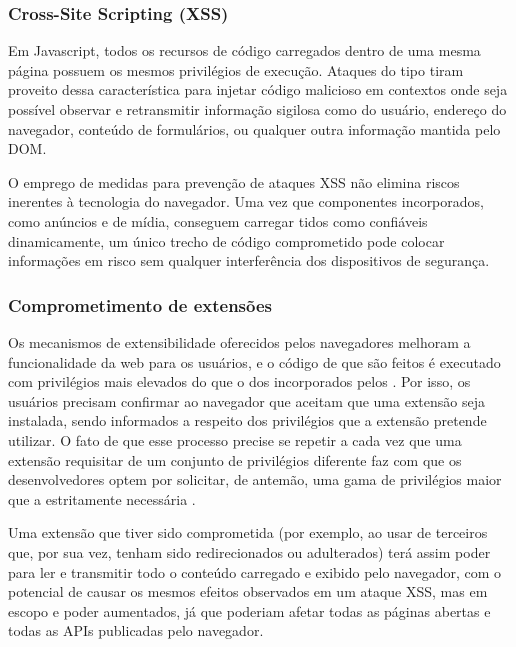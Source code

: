 \subsubsection{Cross-Site Scripting (XSS)}
Em Javascript, todos os recursos de código carregados dentro de uma mesma página possuem os mesmos privilégios de execução. Ataques do tipo  tiram proveito dessa característica para injetar código malicioso em contextos onde seja possível observar e retransmitir informação sigilosa como  do usuário, endereço do navegador, conteúdo de formulários, ou qualquer outra informação mantida pelo DOM.

O emprego de medidas para prevenção de ataques XSS \cite{OWASP:XSS-CheatSheet}  não elimina riscos inerentes à tecnologia do navegador. Uma vez que componentes incorporados, como anúncios e  de mídia, conseguem carregar {\scripts} tidos como confiáveis dinamicamente, um único trecho de código comprometido pode colocar informações em risco sem qualquer interferência dos dispositivos de segurança.



\subsubsection{Comprometimento de extensões}
Os mecanismos de extensibilidade oferecidos pelos navegadores melhoram a funcionalidade da web para os usuários, e o código de que são feitos é executado com privilégios mais elevados do que o dos {\scripts} incorporados pelos . Por isso, os usuários precisam confirmar ao navegador que aceitam que uma extensão seja instalada, sendo informados a respeito dos privilégios que a extensão pretende utilizar. O fato de que esse processo precise se repetir a cada vez que uma extensão requisitar de um conjunto de privilégios diferente faz com que os desenvolvedores optem por solicitar, de antemão, uma gama de privilégios maior que a estritamente necessária \cite{Heule2015_Most_Dangerous_Code}.

Uma extensão que tiver sido comprometida (por exemplo, ao usar {\scripts} de terceiros que, por sua vez, tenham sido redirecionados ou adulterados) terá assim poder para ler e transmitir todo o conteúdo carregado e exibido pelo navegador, com o potencial de causar os mesmos efeitos observados em um ataque XSS, mas em escopo e poder aumentados, já que poderiam afetar todas as páginas abertas e todas as APIs publicadas pelo navegador.

